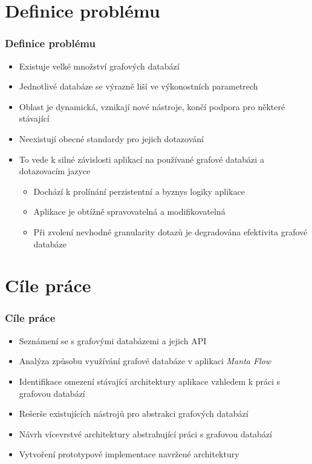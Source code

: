 \documentclass{beamer}
\begin{document}
\section{Definice problému}
\begin{frame}
\frametitle{Definice problému}
   \begin{itemize}
      \item Existuje velké množství grafových databází
      \item Jednotlivé databáze se výrazně liší ve výkonostních parametrech
      \item Oblast je dynamická, vznikají nové nástroje, končí podpora pro některé stávající
      \item Neexistují obecné standardy pro jejich dotazování
      \item To vede k silné závislosti aplikací na používané grafové databázi a dotazovacím jazyce
      \begin{itemize}
         \item Dochází k prolínání perzistentní a byznys logiky aplikace
         \item Aplikace je obtížně spravovatelná a modifikovatelná
         \item Při zvolení nevhodné granularity dotazů je degradována efektivita grafové databáze
      \end{itemize}
   \end{itemize}
\end{frame}

\section{Cíle práce}
\begin{frame}
\frametitle{Cíle práce}
   \begin{itemize}
      \item Seznámení se s grafovými databázemi a jejich API
      \item Analýza způsobu využívání grafové databáze v aplikaci \textit{Manta Flow}
      \item Identifikace omezení stávající architektury aplikace vzhledem k práci s grafovou databází
      \item Rešerše existujících nástrojů pro abstrakci grafových databází
      \item Návrh vícevrstvé architektury abstrahující práci s grafovou databází
      \item Vytvoření prototypové implementace navržené architektury
   \end{itemize}
\end{frame}
\end{document}
